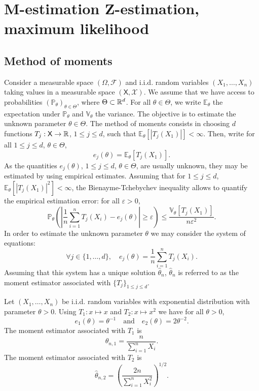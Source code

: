 \documentclass[english,graybox,envcountchap,envcountsame,sectrefs,shortlabels]{svmono}
\theoremstyle{style}
\newcommand{\eqsp}{}
\newcommand{\Xset}{\mathsf{X}}
\newcommand{\Xsigma}{\mathcal{X}}
\begin{document}
\appendix 

\chapter{M-estimation Z-estimation, maximum likelihood}

\section{Method of moments}
Consider a measurable space $(\Omega,\mathcal{F})$ and i.i.d. random variables $(X_1,\ldots,X_n)$ taking values in a measurable space $(\Xset,\Xsigma)$. We assume that we have access to probabilities $(\mathbb{P}_\theta)_{\theta\in\Theta}$, where $\Theta \subset\mathbb{R}^d$. For all $\theta\in\Theta$, we write $\mathbb{E}_\theta$ the expectation under $\mathbb{P}_\theta$ and $\mathbb{V}_\theta$ the variance. The objective is to estimate the unknown parameter $\theta\in\Theta$. The method of moments consists in choosing $d$ functions $T_j:\Xset\to \rset$, $1\leq j\leq d$, such that $\mathbb{E}_\theta[|T_j(X_1)|]<\infty$. Then, write for all $1\leq j \leq d$, $\theta\in\Theta$,
$$
e_j(\theta) = \mathbb{E}_\theta[T_j(X_1)]\eqsp.
$$
As the quantities $e_j(\theta)$, $1\leq j \leq d$, $\theta\in\Theta$,  are usually unknown, they may be estimated by using empirical estimates. Assuming that for $1\leq j\leq d$, $\mathbb{E}_\theta[|T_j(X_1)|^2]<\infty$, the Bienayme-Tchebychev inequality allows to quantify the empirical estimation error: for all $\varepsilon>0$,
$$
\mathbb{P}_\theta\left(\left|\frac{1}{n}\sum_{i=1}^{n}T_j(X_i)-e_j(\theta)\right|\geq \varepsilon\right) \leq \frac{\mathbb{V}_\theta[T_j(X_1)]}{n\varepsilon^2}\eqsp.
$$
In order to estimate the unknown parameter $\theta$ we may consider the system of equations:
$$
\forall j\in\{1,\ldots,d\},\quad e_j(\theta) = \frac{1}{n}\sum_{i=1}^n T_j(X_i)\eqsp.
$$
Assuming that this system has a unique solution $\widehat \theta_n$, $\widehat \theta_n$ is referred to as the moment estimator associated with $\{T_j\}_{1\leq j\leq d}$.

\begin{example}
Let $(X_1,\ldots,X_n)$ be i.i.d. random variables with exponential distribution with parameter $\theta>0$. Using $T_1:x\mapsto x$ and $T_2:x\mapsto x^2$ we have for all $\theta>0$,
$$
e_1(\theta) = \theta^{-1}\quad\mathrm{and}\quad e_2(\theta) = 2\theta^{-2}\eqsp.
$$
The moment estimator associated with $T_1$ is
$$
\widehat \theta_{n,1} = \frac{n}{\sum_{i=1}^nX_i}\eqsp.
$$
The moment estimator associated with $T_2$ is
$$
\widehat \theta_{n,2} = \left(\frac{2n}{\sum_{i=1}^nX^2_i}\right)^{1/2}\eqsp.
$$
\end{example}
\end{document}
